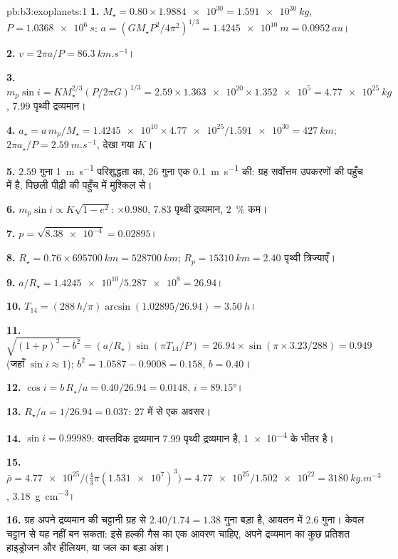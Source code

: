 \begin{solution}{pb:b3:exoplanets:1}
\textbf{1.} $M_\star = 0.80\times\num{1.9884e30} = \qty{1.591e30}{kg}$, $P =
\qty{1.0368e6}{s}$: $a = (GM_\star P^2/4\pi^2)^{1/3} = \qty{1.4245e10}{m}
= \qty{0.0952}{au}$।

\textbf{2.} $v = 2\pi a/P = \qty{86.3}{km.s^{-1}}$।

\textbf{3.} $m_p\sin i = KM_\star^{2/3}(P/2\pi G)^{1/3} = 2.59\times\num{1.363e20}
\times\num{1.352e5} = \qty{4.77e25}{kg}$, \num{7.99} पृथ्वी द्रव्यमान।

\textbf{4.} $a_\star = a\,m_p/M_\star = \num{1.4245e10}\times\num{4.77e25}/
\num{1.591e30} = \qty{427}{km}$; $2\pi a_\star/P = \qty{2.59}{m.s^{-1}}$,
देखा गया $K$।

\textbf{5.} $2.59$ गुना \qty{1}{m.s^{-1}} परिशुद्धता का, 26 गुना एक
\qty{0.1}{m.s^{-1}} की: ग्रह सर्वोत्तम उपकरणों की पहुँच में है,
पिछली पीढ़ी की पहुँच में मुश्किल से।

\textbf{6.} $m_p\sin i \propto K\sqrt{1 - e^2}$: $\times0.980$, 7.83 पृथ्वी
द्रव्यमान, \qty{2}{\percent} कम।

\textbf{7.} $p = \sqrt{\num{8.38e-4}} = 0.02895$।

\textbf{8.} $R_\star = 0.76\times\qty{695700}{km} = \qty{528700}{km}$; $R_p =
\qty{15310}{km} = 2.40$ पृथ्वी त्रिज्याएँ।

\textbf{9.} $a/R_\star = \num{1.4245e10}/\num{5.287e8} = 26.94$।

\textbf{10.} $T_{14} = (\qty{288}{h}/\pi)\arcsin(1.02895/26.94) = \qty{3.50}{h}$।

\textbf{11.} $\sqrt{(1 + p)^2 - b^2} = (a/R_\star)\sin(\pi T_{14}/P) = 26.94\times
\sin(\pi\times3.23/288) = 0.949$ (जहाँ $\sin i \approx 1$); $b^2 =
1.0587 - 0.9008 = 0.158$, $b = 0.40$।

\textbf{12.} $\cos i = b\,R_\star/a = 0.40/26.94 = 0.0148$, $i = \ang{89.15}$।

\textbf{13.} $R_\star/a = 1/26.94 = 0.037$: 27 में से एक अवसर।

\textbf{14.} $\sin i = 0.99989$: वास्तविक द्रव्यमान 7.99 पृथ्वी द्रव्यमान है,  \num{1e-4} के भीतर है।

\textbf{15.} $\bar\rho = \num{4.77e25}/\bigl(\tfrac43\pi(\num{1.531e7})^3\bigr) =
\num{4.77e25}/\num{1.502e22} = \qty{3180}{kg.m^{-3}}$,
\qty{3.18}{g.cm^{-3}}।

\textbf{16.} ग्रह अपने द्रव्यमान की चट्टानी ग्रह से $2.40/1.74 = 1.38$ गुना बड़ा है,
आयतन में 2.6 गुना। केवल चट्टान से यह नहीं बन सकता: इसे
हल्की गैस का एक आवरण चाहिए, अपने द्रव्यमान का कुछ प्रतिशत हाइड्रोजन और हीलियम,
या जल का बड़ा अंश।


\end{solution}
